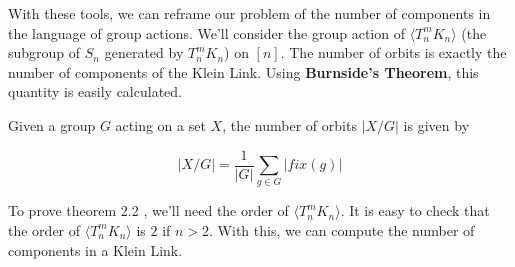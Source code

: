 \documentclass[12pt]{article}
\newenvironment{theorem}[2][Theorem]{\begin{trivlist}
\item[\hskip \labelsep {\bfseries #1}\hskip \labelsep {\bfseries #2.}]}{\end{trivlist}}
\begin{document}
With these tools, we can reframe our problem of the number of components in the language of group actions. We'll consider the group action of $\langle T_n^m K_n \rangle$ (the subgroup of $S_n$ generated by $T_n^m K_n$) on $[n]$. The number of orbits is exactly the number of components of the Klein Link. Using \textbf{Burnside's Theorem}, this quantity is easily calculated.

\begin{theorem}{2.2}
Given a group $G$ acting on a set $X$, the number of orbits $|X/G|$ is given by

\begin{equation}
|X/G| = \frac{1}{|G|}\sum_{g\in G} |fix(g)|
\end{equation}
\end{theorem}

To prove theorem 2.2 , we'll need the order of $\langle T_n^m K_n \rangle$. It is easy to check that the order of $\langle T_n^m K_n \rangle$ is $2$ if $n>2$. With this, we can compute the number of components in a Klein Link.
\end{document}
